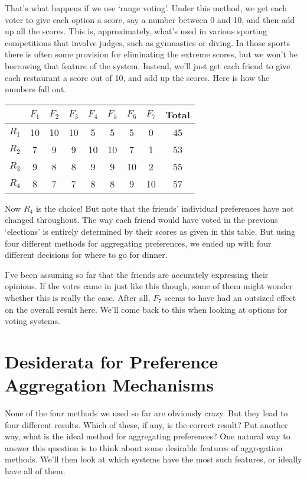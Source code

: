 \begin{multicols}{2}
That's what happens if we use `range voting'. Under this method, we get each voter to give each option a score, say a number between 0 and 10, and then add up all the scores. This is, approximately, what's used in various sporting competitions that involve judges, such as gymnastics or diving. In those sports there is often some provision for eliminating the extreme scores, but we won't be borrowing that feature of the system. Instead, we'll just get each friend to give each restaurant a score out of 10, and add up the scores. Here is how the numbers fall out.

\begin{center}
\begin{tabular}{r | c c c c c c c c}
 & $F_1$ & $F_2$ & $F_3$ & $F_4$ & $F_5$ & $F_6$ & $F_7$ & Total \\ \hline
$R_1$ & 10 & 10 & 10 & 5 & 5 & 5 & 0 & 45 \\
$R_2$ & 7 & 9 & 9 & 10 & 10 & 7 & 1 & 53\\
$R_3$ & 9 & 8 & 8 & 9 & 9 & 10 & 2 & 55 \\
$R_4$ &8 & 7 & 7 & 8 & 8 & 9 & 10 & 57
\end{tabular}
\end{center}Now $R_4$ is the choice! But note that the friends' individual preferences have not changed throughout. The way each friend would have voted in the previous `elections' is entirely determined by their scores as given in this table. But using four different methods for aggregating preferences, we ended up with four different decisions for where to go for dinner.

I've been assuming so far that the friends are accurately expressing their opinions. If the votes came in just like this though, some of them might wonder whether this is really the case. After all, $F_7$ seems to have had an outsized effect on the overall result here. We'll come back to this when looking at options for voting systems.

\section{Desiderata for Preference Aggregation Mechanisms}
None of the four methods we used so far are obviously crazy. But they lead to four different results. Which of these, if any, is the correct result? Put another way, what is the ideal method for aggregating preferences? One natural way to answer this question is to think about some desirable features of aggregation methods. We'll then look at which systems have the most such features, or ideally have all of them.


\end{multicols}
